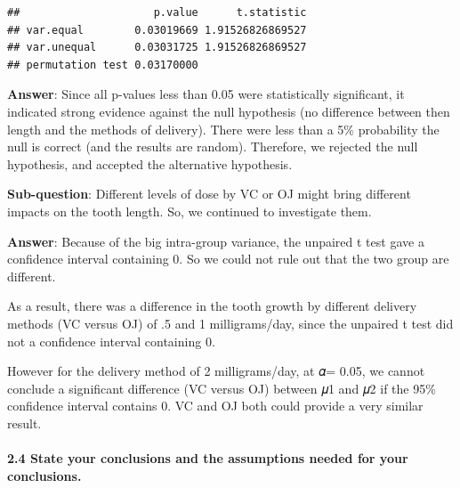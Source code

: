 \documentclass[
  landscape]{article}
\newenvironment{Shaded}{\begin{snugshade}}{\end{snugshade}}
\newcommand{\KeywordTok}[1]{\textcolor[rgb]{0.13,0.29,0.53}{\textbf{#1}}}
\newcommand{\NormalTok}[1]{#1}
\newcommand{\OperatorTok}[1]{\textcolor[rgb]{0.81,0.36,0.00}{\textbf{#1}}}
\newcommand{\StringTok}[1]{\textcolor[rgb]{0.31,0.60,0.02}{#1}}
\begin{document}
\begin{Shaded}
\end{Shaded}

\begin{verbatim}
##                     p.value      t.statistic
## var.equal        0.03019669 1.91526826869527
## var.unequal      0.03031725 1.91526826869527
## permutation test 0.03170000
\end{verbatim}

\textbf{Answer}: Since all p-values less than 0.05 were statistically
significant, it indicated strong evidence against the null hypothesis
(no difference between then length and the methods of delivery). There
were less than a 5\% probability the null is correct (and the results
are random). Therefore, we rejected the null hypothesis, and accepted
the alternative hypothesis.

\textbf{Sub-question}: Different levels of dose by VC or OJ might bring
different impacts on the tooth length. So, we continued to investigate
them.

\textbf{Answer}: Because of the big intra-group variance, the unpaired t
test gave a confidence interval containing 0. So we could not rule out
that the two group are different.

As a result, there was a difference in the tooth growth by different
delivery methods (VC versus OJ) of .5 and 1 milligrams/day, since the
unpaired t test did not a confidence interval containing 0.

However for the delivery method of 2 milligrams/day, at 𝛼= 0.05, we
cannot conclude a significant difference (VC versus OJ) between 𝜇1 and
𝜇2 if the 95\% confidence interval contains 0. VC and OJ both could
provide a very similar result.

\hypertarget{state-your-conclusions-and-the-assumptions-needed-for-your-conclusions.}{%
\paragraph{2.4 State your conclusions and the assumptions needed for
your
conclusions.}\label{state-your-conclusions-and-the-assumptions-needed-for-your-conclusions.}}
\end{document}
